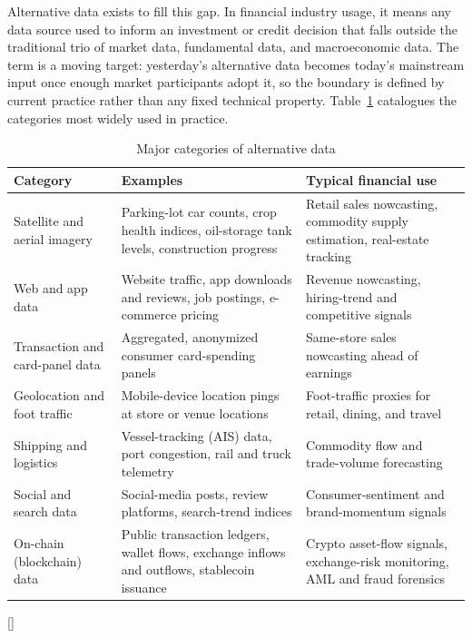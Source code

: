 \documentclass[../ai_in_finance]{subfiles}
\begin{document}
Alternative data exists to fill this gap. In financial industry usage, it means any data source used to inform an investment or credit decision that falls outside the traditional trio of market data, fundamental data, and macroeconomic data. The term is a moving target: yesterday's alternative data becomes today's mainstream input once enough market participants adopt it, so the boundary is defined by current practice rather than any fixed technical property. Table~\ref{tab:alt_data_sources} catalogues the categories most widely used in practice.

\begin{table}[htbp]
\centering
\begin{lrbox}{\bookmeasuredbox}
\begin{tabular}{p{2.6cm}p{6.2cm}p{5.4cm}}
\toprule
Category & Examples & Typical financial use \\
\midrule
Satellite and aerial imagery & Parking-lot car counts, crop health indices, oil-storage tank levels, construction progress & Retail sales nowcasting, commodity supply estimation, real-estate tracking \\
Web and app data & Website traffic, app downloads and reviews, job postings, e-commerce pricing & Revenue nowcasting, hiring-trend and competitive signals \\
Transaction and card-panel data & Aggregated, anonymized consumer card-spending panels & Same-store sales nowcasting ahead of earnings \\
Geolocation and foot traffic & Mobile-device location pings at store or venue locations & Foot-traffic proxies for retail, dining, and travel \\
Shipping and logistics & Vessel-tracking (AIS) data, port congestion, rail and truck telemetry & Commodity flow and trade-volume forecasting \\
Social and search data & Social-media posts, review platforms, search-trend indices & Consumer-sentiment and brand-momentum signals \\
On-chain (blockchain) data & Public transaction ledgers, wallet flows, exchange inflows and outflows, stablecoin issuance & Crypto asset-flow signals, exchange-risk monitoring, AML and fraud forensics \\
\bottomrule
\end{tabular}
\end{lrbox}
\ifdim\wd\bookmeasuredbox<0.65\linewidth
\setlength{\bookcapwidth}{0.65\linewidth}
\else
\setlength{\bookcapwidth}{\wd\bookmeasuredbox}
\fi
{}[\bookcapwidth]{
\usebox{\bookmeasuredbox}
}{
\caption{Major categories of alternative data}
\label{tab:alt_data_sources}
}
\end{table}
\end{document}

